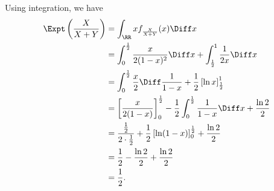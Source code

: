 \begin{enumerate}
          Using integration, we have
          \begin{align*}
              \Expt\left(\frac{X}{X + Y}\right) & = \int_{\RR} x f_{\frac{X}{X + Y}}(x) \Diff x                                                                                      \\
                                                & = \int_{0}^{\frac{1}{2}} \frac{x}{2 (1 - x)^2} \Diff x + \int_{\frac{1}{2}}^{1} \frac{1}{2x} \Diff x                               \\
                                                & = \int_{0}^{\frac{1}{2}} \frac{x}{2} \Diff \frac{1}{1 - x} + \frac{1}{2} \left[\ln x\right]_{\frac{1}{2}}^{1}                      \\
                                                & = \left[\frac{x}{2(1 - x)}\right]_{0}^{\frac{1}{2}} - \frac{1}{2} \int_{0}^{\frac{1}{2}} \frac{1}{1 - x} \Diff x + \frac{\ln 2}{2} \\
                                                & = \frac{\frac{1}{2}}{2 \cdot \frac{1}{2}} + \frac{1}{2} \left[\ln(1 - x)\right]_{0}^{\frac{1}{2}} + \frac{\ln 2}{2}                \\
                                                & = \frac{1}{2} - \frac{\ln 2}{2} + \frac{\ln 2}{2}                                                                                  \\
                                                & = \frac{1}{2}.
          \end{align*}
\end{enumerate}